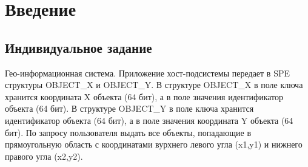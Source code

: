 \section{Введение}

\subsection{Индивидуальное задание}

Гео-информационная система. Приложение хост-подсистемы передает в SPE структуры OBJECT\_X и OBJECT\_Y. В структуре OBJECT\_X в поле ключа хранится координата X объекта (64 бит), а в поле значения идентификатор объекта (64 бит). В структуре OBJECT\_Y в поле ключа хранится идентификатор объекта (64 бит), а в поле значения координата Y объекта (64 бит). По запросу пользователя выдать все объекты, попадающие в прямоугольную область с координатами вурхнего левого угла (x1,y1) и нижнего правого угла (x2,y2).